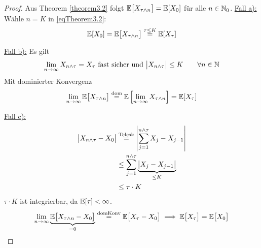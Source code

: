 \begin{proof}
Aus Theorem \ref{theorem3.2} folgt $\mathbb{E}\big[X_{\tau\wedge n}\big]=\mathbb{E}[X_0]$ für alle $n\in\mathbb{N}_0$.\nl
\underline{Fall a):}\\
Wähle $n=K$ in \eqref{eqTheorem3.2}:
\begin{align*}
\mathbb{E}[X_0]=\mathbb{E}\big[X_{\tau\wedge n}\big]\stackrel{\tau\leq K}{=}\mathbb{E}[X_\tau]
\end{align*}

\underline{Fall b):} Es gilt
\begin{align*}
\lim\limits_{n\to\infty} X_{n\wedge\tau}=X_\tau\text{ fast sicher und }\big| X_{n\wedge\tau}\big|\leq K\qquad\forall n\in\mathbb{N}
\end{align*}
Mit dominierter Konvergenz
\begin{align*}
\lim\limits_{n\to\infty}\mathbb{E}\big[X_{\tau\wedge n}\big]\stackrel{\text{dom}}{=}\mathbb{E}\left[\lim\limits_{n\to\infty} X_{\tau\wedge n}\right]=\mathbb{E}[X_\tau]
\end{align*}

\underline{Fall c):}
\begin{align*}
\big| X_{n\wedge\tau}-X_0\big|
&\stackrel{\text{Telesk}}{=}
\left|\sum\limits_{j=1}^{n\wedge\tau} X_j-X_{j-1}\right|\\
&\leq\sum\limits_{j=1}^{n\wedge\tau} \underbrace{\big|X_j-X_{j-1}\big|}_{\leq K}\\
&\leq\tau\cdot K
\end{align*}
$\tau\cdot K$ ist integrierbar, da $\mathbb{E}[\tau]<\infty$.
\begin{align*}
\lim\limits_{n\to\infty}\underbrace{\mathbb{E}\big[X_{\tau\wedge n}-X_0\big]}_{=0}\stackrel{\text{domKonv}}{=}\mathbb{E}\big[X_\tau-X_0\big]
\implies
\mathbb{E}\big[X_\tau\big]=\mathbb{E}\big[X_0\big]
\end{align*}
\end{proof}

